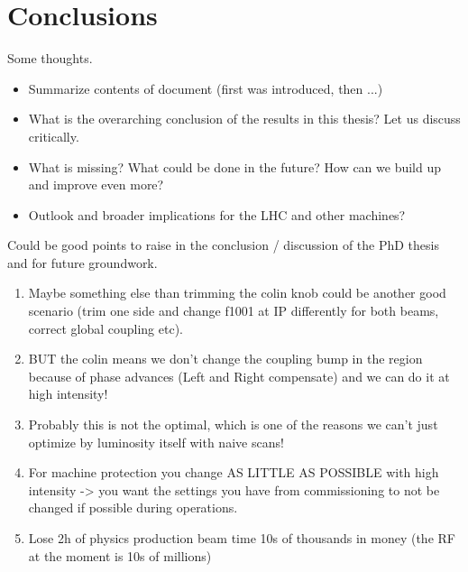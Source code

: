 \chapter{Conclusions}
\label{chapter:conclusion}

Some thoughts.

\begin{itemize}
    \item Summarize contents of document (first was introduced, then ...)
    \item What is the overarching conclusion of the results in this thesis? Let us discuss critically.
    \item What is missing? What could be done in the future? How can we build up and improve even more?
    \item Outlook and broader implications for the LHC and other machines?
\end{itemize}

Could be good points to raise in the conclusion / discussion of the PhD thesis and for future groundwork.

\begin{enumerate}
    \item Maybe something else than trimming the colin knob could be another good scenario (trim one side and change f1001 at IP differently for both beams, correct global coupling etc).
    \item BUT the colin means we don't change the coupling bump in the region because of phase advances (Left and Right compensate) and we can do it at high intensity!
    \item Probably this is not the optimal, which is one of the reasons we can't just optimize by luminosity itself with naive scans!
    \item For machine protection you change AS LITTLE AS POSSIBLE with high intensity -> you want the settings you have from commissioning to not be changed if possible during operations.
    \item Lose 2h of physics production beam time 10s of thousands in money (the RF at the moment is 10s of millions)
\end{enumerate}

\glsresetall                                     %


